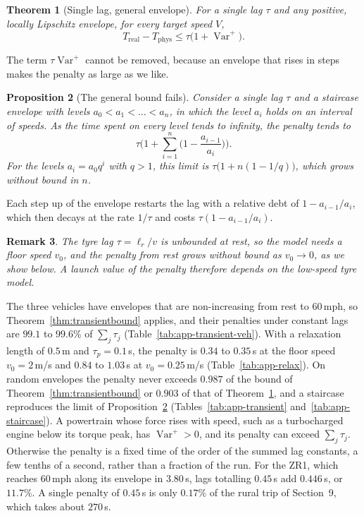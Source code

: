 \documentclass[12pt, twoside]{amsart}
\newtheorem{theorem}{Theorem}[section]
\newtheorem{proposition}[theorem]{Proposition}
\newtheorem{remark}[theorem]{Remark}
\theoremstyle{definition}
\newcommand{\mainref}[2]{#2}
\begin{document}
\begin{theorem}[Single lag, general envelope]\label{thm:transientvar}
For a single lag $\tau$ and any positive, locally Lipschitz envelope, for every target speed $V$,
\[
T_{\mathrm{real}}-T_{\mathrm{phys}}\le\tau\big(1+\operatorname{Var}^+\big).
\]
\end{theorem}

The term $\tau\operatorname{Var}^+$ cannot be removed, because an envelope that rises in steps makes
the penalty as large as we like.

\begin{proposition}[The general bound fails]\label{prop:transientfail}
Consider a single lag $\tau$ and a staircase envelope with levels $a_0<a_1<\dots<a_n$, in which the
level $a_i$ holds on an interval of speeds. As the time spent on every level tends to infinity, the
penalty tends to
\[
\tau\Big(1+\sum_{i=1}^n\Big(1-\frac{a_{i-1}}{a_i}\Big)\Big).
\]
For the levels $a_i=a_0q^i$ with $q>1$, this limit is $\tau\big(1+n(1-1/q)\big)$, which grows without
bound in $n$.
\end{proposition}

Each step up of the envelope restarts the lag with a relative debt of $1-a_{i-1}/a_i$, which then
decays at the rate $1/\tau$ and costs $\tau(1-a_{i-1}/a_i)$.

\begin{remark}\label{rem:relax}
The tyre lag $\tau=\ell_r/v$ is unbounded at rest, so the model needs a floor speed $v_0$, and the
penalty from rest grows without bound as $v_0\to0$, as we show below. A launch value
of the penalty therefore depends on the low-speed tyre model.
\end{remark}

The three vehicles have envelopes that are non-increasing from rest to $60$\,mph, so
Theorem~\ref{thm:transientbound} applies, and their penalties under constant lags are $99.1$ to
$99.6\%$ of $\sum_j\tau_j$ (Table~\ref{tab:app-transient-veh}).
With a relaxation length of $0.5$\,m and $\tau_p=0.1$\,s, the penalty is $0.34$ to $0.35$\,s at the
floor speed $v_0=2$\,m/s and $0.84$ to $1.03$\,s at $v_0=0.25$\,m/s (Table~\ref{tab:app-relax}). On random envelopes the penalty never exceeds $0.987$ of the bound of
Theorem~\ref{thm:transientbound} or $0.903$ of that of Theorem~\ref{thm:transientvar}, and a staircase
reproduces the limit of Proposition~\ref{prop:transientfail}
(Tables~\ref{tab:app-transient} and~\ref{tab:app-staircase}). A powertrain whose force
rises with speed, such as a turbocharged engine below its torque peak, has $\operatorname{Var}^+>0$,
and its penalty can exceed $\sum_j\tau_j$. Otherwise the penalty is a fixed time of the order of the
summed lag constants, a few tenths of a second, rather than a fraction of the run. For the ZR1, which reaches $60$\,mph along its envelope in
$3.80$\,s, lags totalling $0.45$\,s add $0.446$\,s, or $11.7\%$. A single penalty of $0.45$\,s is only
$0.17\%$ of the rural trip of Section~\mainref{sec:transit}{9}, which takes about $270$\,s.
\end{document}
